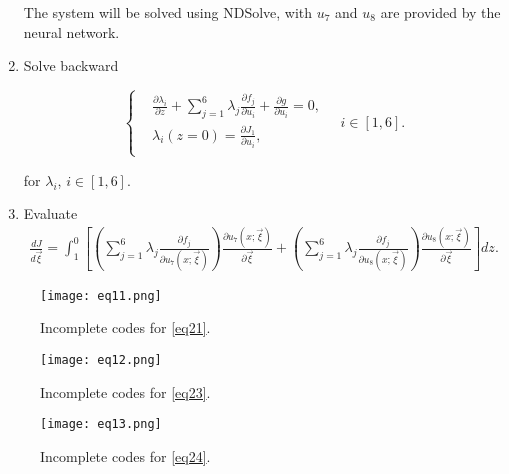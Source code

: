 \documentclass[11pt]{article}
\renewcommand{\today}{\shortmonthname[\the\month] \the \day,  \the\year}
\begin{document}
\begin{enumerate}
	The system will be solved using NDSolve, with $u_{7}$ and $u_{8}$ are provided by the neural network.
	
	
	\item Solve backward
	
	\begin{equation}
		\left\{
		\begin{aligned}
			& \frac{{\partial {\lambda _i}}}{{\partial z}} + \sum\limits_{j = 1}^6 {{\lambda _j}\frac{{\partial {f_j}}}{{\partial {u_i}}}}  + \frac{{\partial g}}{{\partial {u_i}}} = 0, \\
			& {\lambda _i}\left( {z = 0} \right) = \frac{{\partial {J_1}}}{{\partial {u_i}}}, \\
		\end{aligned}
		\right.
		\quad i \in \left[ {1,6} \right].
		\label{eq23}
	\end{equation}
	
	for $\lambda_{i}$, $i \in \left[ {1,6} \right]$.
	
	\item Evaluate 
	\begin{equation}
		\begin{split}
			\frac{{dJ}}{{d\vec \xi }} = \int_1^0 {\left[ {\left( {\sum\limits_{j = 1}^6 {{\lambda _j}\frac{{\partial {f_j}}}{{\partial {u_7}\left( {x;\vec \xi } \right)}}} } \right)\frac{{\partial {u_7}\left( {x;\vec \xi } \right)}}{{\partial \vec \xi }} + \left( {\sum\limits_{j = 1}^6 {{\lambda _j}\frac{{\partial {f_j}}}{{\partial {u_8}\left( {x;\vec \xi } \right)}}} } \right)\frac{{\partial {u_8}\left( {x;\vec \xi } \right)}}{{\partial \vec \xi }}} \right]dz}. 
		\end{split}
		\label{eq24}
	\end{equation}

\end{enumerate}
	
	\begin{figure}[!htb]
		\centering
		\texttt{[image: eq11.png]}
		\caption{Incomplete codes for \eqref{eq21}.}
	\end{figure}
%
\begin{figure}[!htb]
	\centering
	\texttt{[image: eq12.png]}
	\caption{Incomplete codes for \eqref{eq23}.}
\end{figure}
%
\begin{figure}[!htb]
	\centering
	\texttt{[image: eq13.png]}
	\caption{Incomplete codes for \eqref{eq24}.}
\end{figure}

%
\end{document}
